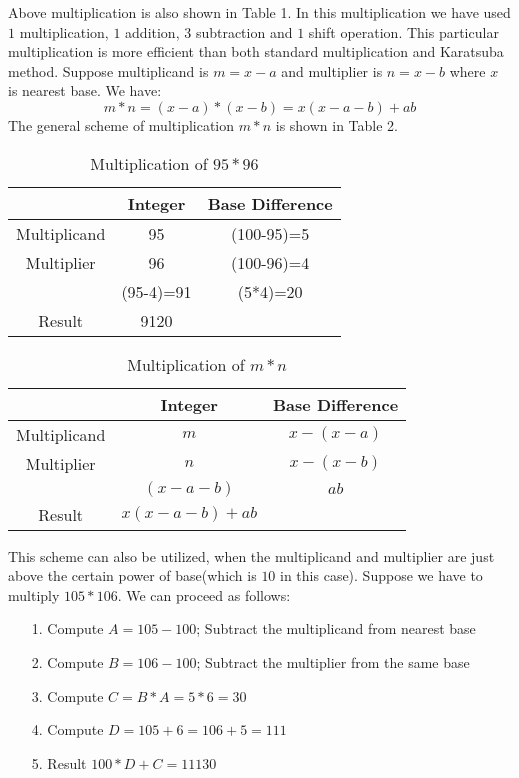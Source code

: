 \documentclass[conference]{IEEEtran}
\begin{document}
Above multiplication is also shown in Table 1. In this multiplication we have used $1$ multiplication, $1$ addition, $3$ subtraction and $1$ shift operation. This particular multiplication is more efficient than both standard multiplication and Karatsuba method. Suppose multiplicand is $m=x-a$ and multiplier is $n=x-b$ where $x$ is nearest base. We have: 
$$ m*n=(x-a)*(x-b)=x(x-a-b)+ab $$ The general scheme of multiplication $m*n$ is shown in Table 2.
\begin{table}[ht]
\renewcommand{\arraystretch}{1.3}
\caption{Multiplication of $95*96$}
\label{table 1}
\begin{center}
\begin{tabular}{|c| c| c| } 
\hline
 & Integer & Base Difference    \\ [1ex] \hline\hline 
Multiplicand & 95 & (100-95)=5   \\ \hline
Multiplier & 96 & (100-96)=4  \\ \hline
 & (95-4)=91 & (5*4)=20  \\ \hline
Result & 9120 &   \\ [1ex] \hline

\end{tabular} 
\end{center}
\end{table} 

\begin{table}[ht]
\renewcommand{\arraystretch}{1.3}
\caption{Multiplication of $m*n$}
\label{table 2}
\begin{center}
\begin{tabular}{|c| c| c| } 
\hline
 & Integer & Base Difference    \\ [1ex] \hline\hline 
Multiplicand & $m$ & $x-(x-a)$   \\ \hline
Multiplier & $n$ & $x-(x-b)$  \\ \hline
 & $(x-a-b)$ & $ab$  \\ \hline
Result & $x(x-a-b)+ab$ &   \\ [1ex] \hline

\end{tabular} 
\end{center}
\end{table} 

This scheme can also be utilized, when the multiplicand and multiplier are just above the certain power of base(which is $10$ in this case). Suppose we have to multiply $105*106$. We can proceed as follows:
\begin{enumerate}
 \item[1.] Compute $A = 105-100$; Subtract the multiplicand from nearest base 
 \item[2.] Compute $B = 106-100$; Subtract the multiplier from the same base
 \item[3.] Compute $C = B*A=5*6=30 $
 \item[4.] Compute $D = 105+6=106+5=111$ 
 \item[5.] Result  $100*D + C = 11130$
\end{enumerate}
\end{document}
